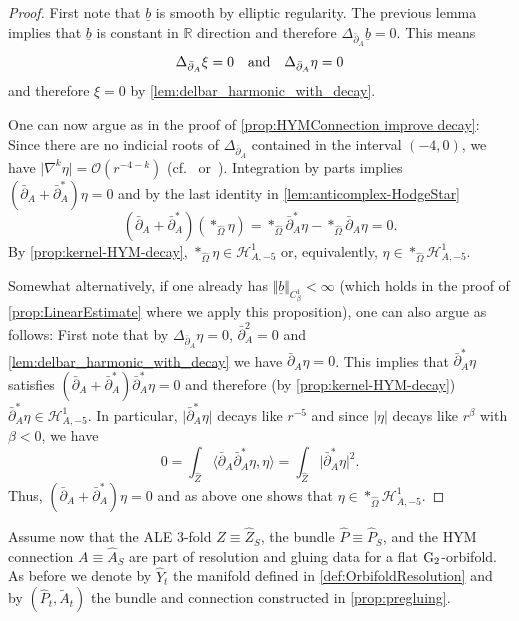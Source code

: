 \documentclass[11pt,a4paper]{scrartcl}
\newcommand{\VertWC}[3]{\Vert_{C^{{#1}}_{{#2}}{#3}}}
\newcommand{\G}{\textup{G}}
\numberwithin{equation}{section}
\theoremstyle{plain}
\theoremstyle{definition}
\theoremstyle{remark}
\begin{document}
\begin{proof}
First note that $\underline{b}$ is smooth by elliptic regularity. The previous lemma implies that $\underline{b}$ is constant in $\mathbb{R}$ direction and therefore $\Delta_{\bar{\partial}_A}\underline{b}=0$. This means \[\Delta_{\bar{\partial}_A} \xi = 0 \quad \textup{and} \quad \Delta_{\bar{\partial}_A} \eta = 0\] and therefore $\xi=0$ by \autoref{lem:delbar_harmonic_with_decay}.

One can now argue as in the proof of \autoref{prop:HYMConnection improve decay}: Since there are no indicial roots of $\Delta_{\bar{\partial}_A}$ contained in the interval $(-4,0)$, we have $\vert \nabla^k \eta \vert = \mathcal{O}(r^{-4-k})$ (cf.~\cite[Proposition~1.14]{Bartnik-MassofALF} 
or~\cite{LockhartMcOwen-ellipticOperators_nonCompactMfds}). Integration by parts implies $(\bar{\partial}_A+\bar{\partial}_A^*)\eta=0$ and by the last identity in \autoref{lem:anticomplex-HodgeStar} \[ (\bar{\partial}_A+\bar{\partial}_A^*)(*_{\hat{\Omega}}\eta) = *_{\hat{\Omega}} \bar{\partial}_A^* \eta - *_{\hat{\Omega}} \bar{\partial}_A \eta = 0. \] By \autoref{prop:kernel-HYM-decay}, $*_{\hat{\Omega}} \eta \in \mathcal{H}^1_{A,-5}$ or, equivalently, $\eta \in *_{\hat{\Omega}}\mathcal{H}^1_{A,-5}$.

Somewhat alternatively, if one already has $\Vert \underline{b} \VertWC{1}{\beta}{}<\infty$ (which holds in the proof of \autoref{prop:LinearEstimate} where we apply this proposition), one can also argue as follows: First note that by $\Delta_{\bar{\partial}_A} \eta = 0$, $\bar{\partial}_A^2=0$ and \autoref{lem:delbar_harmonic_with_decay} we have $\bar{\partial}_A \eta =0$. This implies that $\bar{\partial}_A^*\eta$ satisfies $(\bar{\partial}_A + \bar{\partial}_A^*) \bar{\partial}_A^*\eta =0$ and therefore (by \autoref{prop:kernel-HYM-decay}) $\bar{\partial}_A^*\eta \in \mathcal{H}^1_{A,-5}$. In particular, $\vert \bar{\partial}_A^*\eta \vert$ decays like $r^{-5}$ and since $\vert \eta\vert$ decays like $r^{\beta}$ with $\beta<0$, we have \[ 0 = \int_{\hat{Z}} \langle \bar{\partial}_A\bar{\partial}_A^*\eta ,\eta\rangle = \int_{\hat{Z}} \vert \bar{\partial}_A^* \eta \vert^2. \] Thus, $(\bar{\partial}_A + \bar{\partial}_A^*) \eta = 0$ and as above one shows that $\eta \in *_{\hat{\Omega}} \mathcal{H}^1_{A,-5}$.
\end{proof}

Assume now that the ALE $3$-fold $\hat{Z}\equiv \hat{Z}_S$, the bundle ${\hat{P}}\equiv\hat{P}_S$, and the HYM connection $A\equiv\hat{A}_S$ are part of resolution and gluing data for a flat $\G_2$-orbifold. As before we denote by $\hat{Y}_t$ the manifold defined in \autoref{def:OrbifoldResolution} and by $(\hat{P}_t,\tilde{A}_t)$ the bundle and connection constructed in \autoref{prop:pregluing}.
\end{document}

